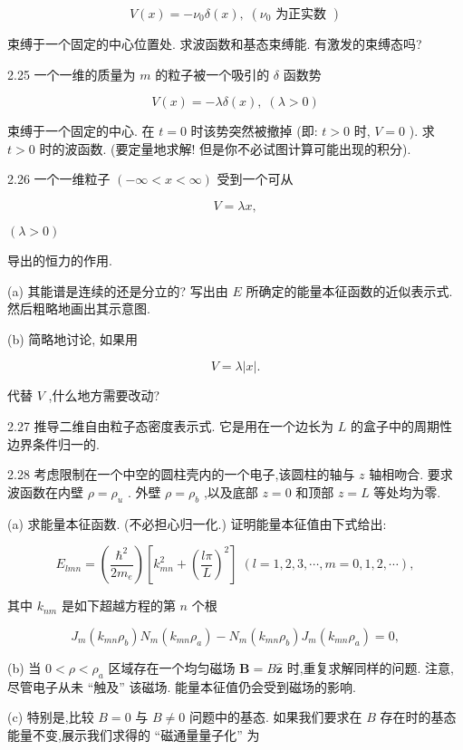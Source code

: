 $$
V\left( x\right) = - {\nu }_{0}\delta \left( x\right) ,\;\left( {{\nu }_{0}\text{ 为正实数 }}\right)
$$

束缚于一个固定的中心位置处. 求波函数和基态束缚能. 有激发的束缚态吗?

2.25 一个一维的质量为 $m$ 的粒子被一个吸引的 $\delta$ 函数势

$$
V\left( x\right) = - {\lambda \delta }\left( x\right) ,\;\left( {\lambda > 0}\right)
$$

束缚于一个固定的中心. 在 $t = 0$ 时该势突然被撤掉 (即: $t > 0$ 时, $V = 0$ ). 求 $t > 0$ 时的波函数. (要定量地求解! 但是你不必试图计算可能出现的积分).

2.26 一个一维粒子 $\left( {-\infty < x < \infty }\right)$ 受到一个可从

$$
V = {\lambda x},
$$

$\left( {\lambda > 0}\right)$

导出的恒力的作用.

(a) 其能谱是连续的还是分立的? 写出由 $E$ 所确定的能量本征函数的近似表示式. 然后粗略地画出其示意图.

(b) 简略地讨论, 如果用

$$
V = \lambda \left| x\right| \text{.}
$$

代替 $V$ ,什么地方需要改动?

2.27 推导二维自由粒子态密度表示式. 它是用在一个边长为 $L$ 的盒子中的周期性边界条件归一的.

2.28 考虑限制在一个中空的圆柱壳内的一个电子,该圆柱的轴与 $z$ 轴相吻合. 要求波函数在内壁 $\rho = {\rho }_{u}$ . 外壁 $\rho = {\rho }_{b}$ ,以及底部 $z = 0$ 和顶部 $z = L$ 等处均为零.

(a) 求能量本征函数. (不必担心归一化.) 证明能量本征值由下式给出:

$$
{E}_{lmn} = \left( \frac{{\hbar }^{2}}{2{m}_{e}}\right) \left\lbrack {{k}_{mn}^{2} + {\left( \frac{l\pi }{L}\right) }^{2}}\right\rbrack \;\left( {l = 1,2,3,\cdots, m = 0,1,2,\cdots }\right) ,
$$

其中 ${k}_{nm}$ 是如下超越方程的第 $n$ 个根

$$
{J}_{m}\left( {{k}_{mn}{\rho }_{b}}\right) {N}_{m}\left( {{k}_{mn}{\rho }_{a}}\right) - {N}_{m}\left( {{k}_{mn}{\rho }_{b}}\right) {J}_{m}\left( {{k}_{mn}{\rho }_{a}}\right) = 0,
$$

(b) 当 $0 < \rho < {\rho }_{a}$ 区域存在一个均匀磁场 $\mathbf{B} = B\widehat{\mathbf{z}}$ 时,重复求解同样的问题. 注意,尽管电子从未 “触及” 该磁场. 能量本征值仍会受到磁场的影响.

(c) 特别是,比较 $B = 0$ 与 $B \neq 0$ 问题中的基态. 如果我们要求在 $B$ 存在时的基态能量不变,展示我们求得的 “磁通量量子化” 为


